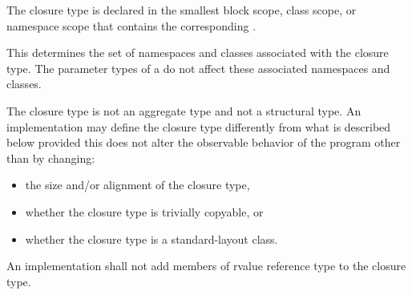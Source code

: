 \pnum
The closure type is declared in the smallest block
scope, class scope, or namespace scope that contains the corresponding
.
\begin{note}
This determines the set of namespaces and
classes associated with the closure type. The parameter
types of a  do not affect these associated namespaces and
classes.
\end{note}
The closure type is not an aggregate type and
not a structural type.
An implementation may define the closure type differently from what
is described below provided this does not alter the observable behavior of the program
other than by changing:
\begin{itemize}
\item the size and/or alignment of the closure type,

\item whether the closure type is trivially copyable, or

\item whether the closure type is a standard-layout class.
\end{itemize}

An implementation shall not add members of rvalue reference type to the closure
type.


